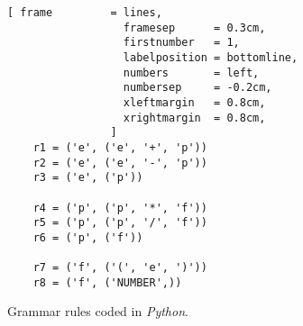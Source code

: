 \begin{table}[!ht]
  \centering
{}
  \caption{The function $\textsl{goto}()$.}
  \label{tab:goto}
\end{table}


\begin{figure}[!ht]
\centering
\begin{Verbatim}[ frame         = lines, 
                  framesep      = 0.3cm, 
                  firstnumber   = 1,
                  labelposition = bottomline,
                  numbers       = left,
                  numbersep     = -0.2cm,
                  xleftmargin   = 0.8cm,
                  xrightmargin  = 0.8cm,
                ]
    r1 = ('e', ('e', '+', 'p'))
    r2 = ('e', ('e', '-', 'p'))
    r3 = ('e', ('p'))
    
    r4 = ('p', ('p', '*', 'f'))
    r5 = ('p', ('p', '/', 'f'))
    r6 = ('p', ('f'))
    
    r7 = ('f', ('(', 'e', ')'))
    r8 = ('f', ('NUMBER',))               
\end{Verbatim}
\vspace*{-0.3cm}
\caption{Grammar rules coded in \textsl{Python}.}
\label{fig:parse-table.stlx:grammar}
\end{figure}


